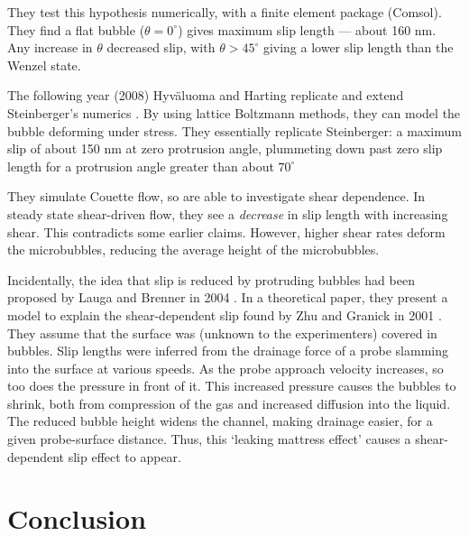 \documentclass[12pt, a4paper, twoside, openright]{book}
\begin{document}
They test this hypothesis numerically, with a finite element package (Comsol).  They find a flat bubble ($\theta = 0^{\circ}$) gives maximum slip length --- about 160 nm.  Any increase in $\theta$ decreased slip, with $\theta > 45^{\circ}$ giving a lower slip length than the Wenzel state.

\vspace*{1em}
The following year (2008) Hyv\"{a}luoma and Harting replicate and extend Steinberger's numerics \cite{HyvaluomaHarting2008}.  By using lattice Boltzmann methods, they can model the bubble deforming under stress.  They essentially replicate Steinberger: a maximum slip of about 150 nm at zero protrusion angle, plummeting down past zero slip length for a protrusion angle greater than about $70^{\circ}$

They simulate Couette flow, so are able to investigate shear dependence.  In steady state shear-driven flow, they see a \emph{decrease} in slip length with increasing shear.  This contradicts some earlier claims.  However, higher shear rates deform the microbubbles, reducing the average height of the microbubbles.


\vspace*{1em}

Incidentally, the idea that slip is reduced by protruding bubbles had been proposed by Lauga and Brenner in 2004 \cite{LaugaBrenner2004}.  In a theoretical paper, they present a model to explain the shear-dependent slip found by Zhu and Granick in 2001 \cite{ZhuGranick2001}.  They assume that the surface was (unknown to the experimenters) covered in bubbles.  Slip lengths were inferred from the drainage force of a probe slamming into the surface at various speeds. As the probe approach velocity increases, so too does the pressure in front of it.  This increased pressure causes the bubbles to shrink, both from compression of the gas and increased diffusion into the liquid.  The reduced bubble height widens the channel, making drainage easier, for a given probe-surface distance.  Thus, this `leaking mattress effect' causes a
\nopagebreak[0] shear-dependent slip effect to appear.


\section{Conclusion}
\end{document}
